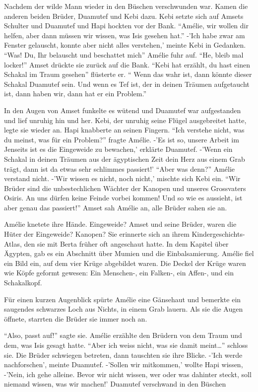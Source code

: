 \documentclass[11pt,titlepage,a5paper]{book}
\begin{document}
Nachdem der wilde Mann wieder in den Büschen verschwunden war. Kamen die anderen beiden Brüder, Duamutef und Kebi dazu. Kebi setzte sich auf Amsets Schulter und Duamutef und Hapi hockten vor der Bank. "`Amélie, wir wollen dir helfen, aber dann müssen wir wissen, was Isis gesehen hat."' -'Ich habe zwar am Fenster gelauscht, konnte aber nicht alles verstehen,' meinte Kebi in Gedanken. "`Was! Du, Ihr belauscht und beschattet mich"' Amélie fuhr auf. "`He, bleib mal locker!"' Amset drückte sie zurück auf die Bank. "`Kebi hat erzählt, du hast einen Schakal im Traum gesehen"' flüsterte er. "` Wenn das wahr ist, dann könnte dieser Schakal Duamutef sein. Und wenn es Tef ist, der in deinen Träumen aufgetaucht ist, dann haben wir, dann hat er ein Problem."'

In den Augen von Amset funkelte es wütend und Duamutef war aufgestanden und lief unruhig hin und her. Kebi, der unruhig seine Flügel  ausgebreitet hatte, legte sie wieder an. Hapi knabberte an seinen  Fingern. "`Ich verstehe nicht, was du meinst, was für ein Problem?"' fragte Amélie. -'Es ist so, unsere Arbeit im Jenseits ist es die Eingeweide zu bewachen,' erklärte Duamutef. -'Wenn ein Schakal in deinen Träumen aus der ägyptischen Zeit dein Herz aus einem Grab trägt, dann ist da etwas sehr schlimmes passiert!' "`Aber was denn?"' Amélie verstand nicht. -'Wir wissen es nicht, noch nicht,' mischte sich Kebi ein. "`Wir Brüder sind die unbestechlichen Wächter der Kanopen und unseres Grossvaters Osiris. An uns dürfen keine Feinde vorbei kommen! Und so wie es aussieht, ist aber genau das passiert!"' Amset sah Amélie an, alle Brüder sahen sie an. 

Amélie knetete ihre Hände. Eingeweide? Amset und seine Brüder, waren die Hüter der Eingeweide? Kanopen? Sie erinnerte sich an ihrem Kindergeschichts-Atlas, den sie mit Berta früher oft angeschaut hatte. In dem Kapitel über Ägypten, gab es ein Abschnitt über Mumien und die Einbalsamierung. Amélie fiel ein Bild ein, auf dem vier Krüge abgebildet waren. Die Deckel der Krüge waren wie Köpfe geformt gewesen: Ein Menschen-, ein Falken-, ein Affen-, und ein Schakalkopf.

Für einen kurzen Augenblick spürte Amélie eine Gänsehaut und bemerkte ein saugendes schwarzes Loch aus Nichts, in einem Grab lauern. Als sie die Augen öffnete, starrten die Brüder sie immer noch an.

"`Also, passt auf!"' sagte sie. Amélie erzählte den Brüdern von dem Traum und dem, was Isis gesagt hatte. "`Aber ich weiss nicht, was sie damit meint\dots"' schloss sie. Die Brüder schwiegen betreten, dann tauschten sie ihre Blicke. -'Ich werde nachforschen', meinte Duamutef. -'Sollen wir mitkommen,' wollte Hapi wissen, -'Nein, ich gehe alleine. Bevor wir nicht wissen, wer oder was dahinter steckt, soll niemand wissen, was wir machen!' Duamutef verschwand in den Büschen
\end{document}
